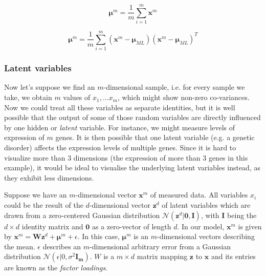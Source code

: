 \begin{equation}\label{eq:derivative_mu_mn}
    \bm{\mu}^m = \frac{1}{m} \sum^m_{i=1} \bm{x}^m
\end{equation}

\begin{equation}\label{eq:derivative_sigma_mn}
    \bm{\mu}^m = \frac{1}{m} \sum^m_{i=1} (\bm{x}^m - \bm{\mu}_{ML}) (\bm{x}^m - \bm{\mu}_{ML})^T
\end{equation}


\subsubsection{Latent variables}


Now let's suppose we find an $m$-dimensional sample, i.e. for every sample we take, we obtain $m$ values of $x_1,...x_m$, which might show non-zero co-variances. Now we could treat all these variables as separate identities, but it is well possible that the output of some of those random variables are directly influenced by one hidden or \textit{latent} variable. For instance, we might measure levels of expression of $m$ genes. It is then possible that one latent variable (e.g. a genetic disorder) affects the expression levels of multiple genes. Since it is hard to visualize more than $3$ dimensions (the expression of more than $3$ genes in this example), it would be ideal to visualise the underlying latent variables instead, as they exhibit less dimensions.

Suppose we have an $m$-dimensional vector $\textbf{x}^m$ of measured data. All variables $x_i$ could be the result of the $d$-dimensional vector $\textbf{z}^d$ of latent variables which are drawn from a zero-centered Gaussian distribution $\mathcal{N}(\textbf{z}^d|\textbf{0},\textbf{I})$, with $\textbf{I}$ being the $d \times d$ identity matrix and $\textbf{0}$ as a zero-vector of length $d$. In our model, $\textbf{x}^m$ is given by $\textbf{x}^m = \textbf{W}\textbf{z}^d + \bm{\mu}^m + \epsilon$. In this case, $\bm{\mu}^m$ is an $m$-dimensional vectors describing the mean. $\epsilon$ describes an $m$-dimensional arbitrary error from a Gaussian distribution $\mathcal{N}(\epsilon|0,\sigma^2 \bm{I_m})$. $W$ is a $m\times d$ matrix mapping $\bm{z}$ to $\bm{x}$ and its entries are known as the \textit{factor loadings}.

